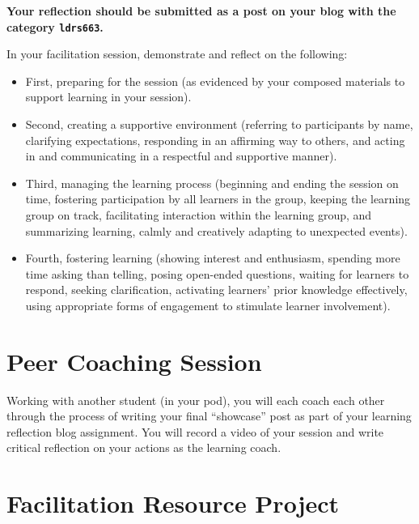 \documentclass[
]{book}
\providecommand{\tightlist}{%
  \setlength{\itemsep}{0pt}\setlength{\parskip}{0pt}}
\begin{document}
\textbf{Your reflection should be submitted as a post on your blog with the category \texttt{ldrs663}.}

In your facilitation session, demonstrate and reflect on the following:

\begin{itemize}
\tightlist
\item
  First, preparing for the session (as evidenced by your composed materials to support learning in your session).\\
\item
  Second, creating a supportive environment (referring to participants by name, clarifying expectations, responding in an affirming way to others, and acting in and communicating in a respectful and supportive manner).\\
\item
  Third, managing the learning process (beginning and ending the session on time, fostering participation by all learners in the group, keeping the learning group on track, facilitating interaction within the learning group, and summarizing learning, calmly and creatively adapting to unexpected events).\\
\item
  Fourth, fostering learning (showing interest and enthusiasm, spending more time asking than telling, posing open-ended questions, waiting for learners to respond, seeking clarification, activating learners' prior knowledge effectively, using appropriate forms of engagement to stimulate learner involvement).
\end{itemize}

\hypertarget{peer-coaching-session}{%
\section*{Peer Coaching Session}\label{peer-coaching-session}}

Working with another student (in your pod), you will each coach each other through the process of writing your final ``showcase'' post as part of your learning reflection blog assignment. You will record a video of your session and write critical reflection on your actions as the learning coach.

\hypertarget{facilitation-resource-project}{%
\section*{Facilitation Resource Project}\label{facilitation-resource-project}}
\end{document}
